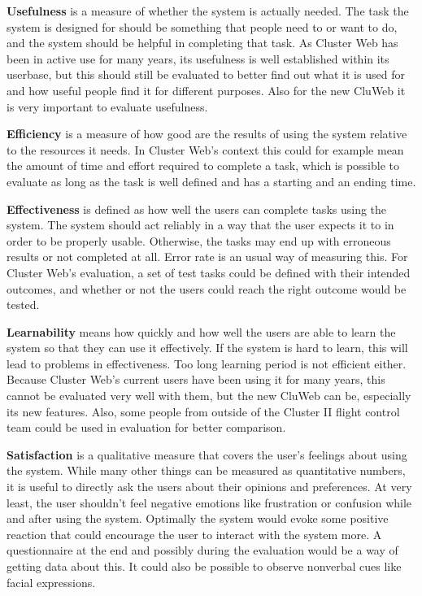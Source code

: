 \textbf{Usefulness} is a measure of whether the system is actually needed. The task the system is designed for should be something that people need to or want to do, and the system should be helpful in completing that task. As Cluster Web has been in active use for many years, its usefulness is well established within its userbase, but this should still be evaluated to better find out what it is used for and how useful people find it for different purposes. Also for the new CluWeb it is very important to evaluate usefulness.

\textbf{Efficiency} is a measure of how good are the results of using the system relative to the resources it needs. In Cluster Web's context this could for example mean the amount of time and effort required to complete a task, which is possible to evaluate as long as the task is well defined and has a starting and an ending time.

\textbf{Effectiveness} is defined as how well the users can complete tasks using the system. The system should act reliably in a way that the user expects it to in order to be properly usable. Otherwise, the tasks may end up with erroneous results or not completed at all. Error rate is an usual way of measuring this. For Cluster Web's evaluation, a set of test tasks could be defined with their intended outcomes, and whether or not the users could reach the right outcome would be tested.

\textbf{Learnability} means how quickly and how well the users are able to learn the system so that they can use it effectively. If the system is hard to learn, this will lead to problems in effectiveness. Too long learning period is not efficient either. Because Cluster Web's current users have been using it for many years, this cannot be evaluated very well with them, but the new CluWeb can be, especially its new features. Also, some people from outside of the Cluster II flight control team could be used in evaluation for better comparison.

\textbf{Satisfaction} is a qualitative measure that covers the user's feelings about using the system. While many other things can be measured as quantitative numbers, it is useful to directly ask the users about their opinions and preferences. At very least, the user shouldn't feel negative emotions like frustration or confusion while and after using the system. Optimally the system would evoke some positive reaction that could encourage the user to interact with the system more. A questionnaire at the end and possibly during the evaluation would be a way of getting data about this. It could also be possible to observe nonverbal cues like facial expressions.

